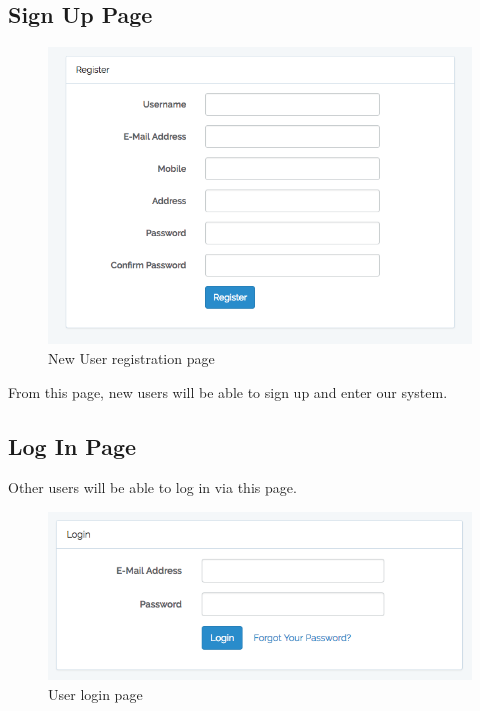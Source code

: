 \subsection{Sign Up Page}
\begin{figure}[h]
      \centering
	\includegraphics[scale=0.5]{register.png}
      \caption{New User registration page}
\end{figure}
From this page, new users will be able to sign up and enter our system.

\subsection{Log In Page}
Other users will be able to log in via this page.
\begin{figure}[h]
      \centering
	\includegraphics[scale=0.5]{login.png}
      \caption{User login page}
\end{figure}
\newpage

